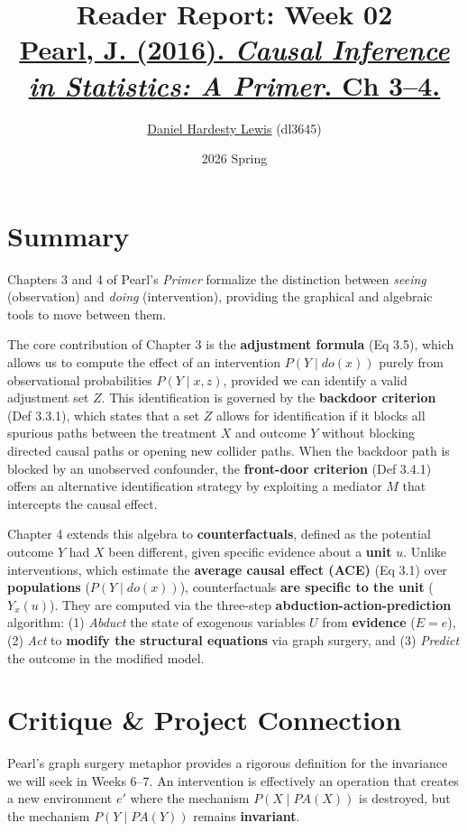 \documentclass[11pt]{article}
\title{\vspace{-2em}\textbf{Reader Report: Week 02} \\ \vspace{0.2em} \large \href{https://www.wiley.com/en-us/Causal+Inference+in+Statistics\%3A+A+Primer-p-9781119186847}{Pearl, J. (2016). \textit{Causal Inference in Statistics: A Primer}. Ch 3--4.}}
\author{\href{https://github.com/dhardestylewis}{Daniel Hardesty Lewis} (dl3645)}
\date{2026 Spring}
\begin{document}
\maketitle
\thispagestyle{fancy}
\vspace{-1em}

\section*{Summary}
Chapters 3 and 4 of Pearl's \textit{Primer} formalize the distinction between \textit{seeing} (observation) and \textit{doing} (intervention), providing the graphical and algebraic tools to move between them. 

The core contribution of Chapter 3 is the \textbf{adjustment formula} (Eq 3.5), which allows us to compute the effect of an intervention $P(Y \mid do(x))$ purely from observational probabilities $P(Y \mid x, z)$, provided we can identify a valid adjustment set $Z$. This identification is governed by the \textbf{backdoor criterion} (Def 3.3.1), which states that a set $Z$ allows for identification if it blocks all spurious paths between the treatment $X$ and outcome $Y$ without blocking directed causal paths or opening new collider paths. When the backdoor path is blocked by an unobserved confounder, the \textbf{front-door criterion} (Def 3.4.1) offers an alternative identification strategy by exploiting a mediator $M$ that intercepts the causal effect.

Chapter 4 extends this algebra to \textbf{counterfactuals}, defined as the potential outcome $Y$ had $X$ been different, given specific evidence about a \textbf{unit} $u$. Unlike interventions, which estimate the \textbf{average causal effect (ACE)} (Eq 3.1) over \textbf{populations} ($P(Y \mid do(x))$), counterfactuals \textbf{are specific to the unit} ($Y_x(u)$). They are computed via the three-step \textbf{abduction-action-prediction} algorithm: (1) \textit{Abduct} the state of exogenous variables $U$ from \textbf{evidence} ($E=e$), (2) \textit{Act} to \textbf{modify the structural equations} via graph surgery, and (3) \textit{Predict} the outcome in the modified model.

\section*{Critique \& Project Connection}
Pearl's graph surgery metaphor provides a rigorous definition for the invariance we will seek in Weeks 6--7. An intervention is effectively an operation that creates a new environment $e'$ where the mechanism $P(X \mid PA(X))$ is destroyed, but the mechanism $P(Y \mid PA(Y))$ remains \textbf{invariant}.
\end{document}
